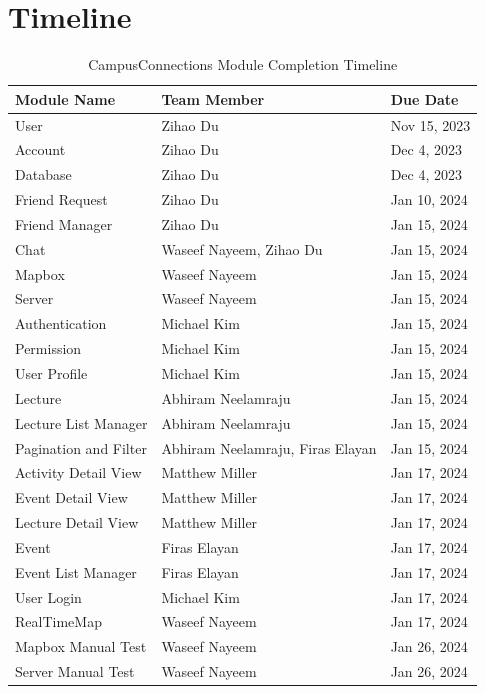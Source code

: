 \documentclass[12pt, titlepage]{article}
\begin{document}
\section{Timeline}
\begin{table}[H]
\centering
\begin{tabular}{p{} p{}  p{}}
\toprule
Module Name & Team Member & Due Date \\
\midrule
User & Zihao Du & Nov 15, 2023\\
Account & Zihao Du & Dec 4, 2023\\
Database & Zihao Du & Dec 4, 2023\\
Friend Request & Zihao Du & Jan 10, 2024\\
Friend Manager & Zihao Du & Jan 15, 2024\\
Chat & Waseef Nayeem, Zihao Du & Jan 15, 2024\\
Mapbox & Waseef Nayeem & Jan 15, 2024\\
Server & Waseef Nayeem & Jan 15, 2024\\
Authentication & Michael Kim & Jan 15, 2024\\
Permission & Michael Kim & Jan 15, 2024\\
User Profile & Michael Kim & Jan 15, 2024\\
Lecture & Abhiram Neelamraju & Jan 15, 2024\\
Lecture List Manager & Abhiram Neelamraju & Jan 15, 2024\\
Pagination and Filter & Abhiram Neelamraju, Firas Elayan & Jan 15, 2024\\
Activity Detail View & Matthew Miller & Jan 17, 2024\\
Event Detail View & Matthew Miller & Jan 17, 2024\\
Lecture Detail View & Matthew Miller & Jan 17, 2024\\
Event & Firas Elayan & Jan 17, 2024\\
Event List Manager & Firas Elayan & Jan 17, 2024\\
User Login & Michael Kim & Jan 17, 2024\\
RealTimeMap & Waseef Nayeem & Jan 17, 2024\\
Mapbox Manual Test & Waseef Nayeem & Jan 26, 2024\\
Server Manual Test & Waseef Nayeem & Jan 26, 2024\\
\bottomrule
\end{tabular}
\caption{CampusConnections Module Completion Timeline}
\end{table}
\end{document}
